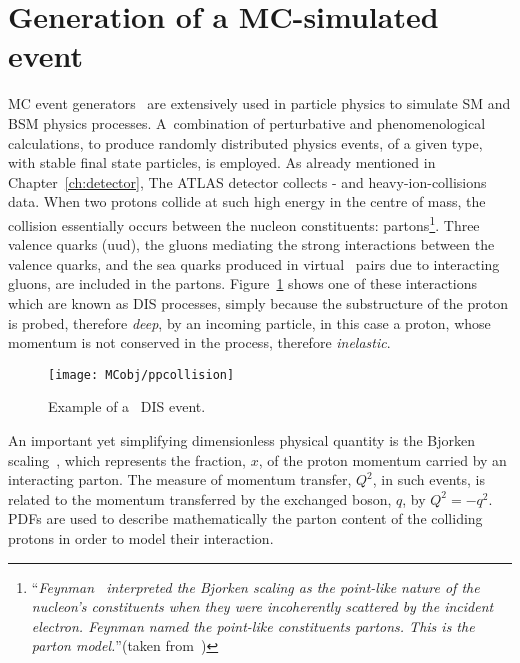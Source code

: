 	\section{Generation of a MC-simulated event}
	\label{sec:evGen}

		\ac{MC} event generators~\cite{Buckley:2011ms} are extensively used in particle physics to simulate \ac{SM} and \ac{BSM} physics processes. A combination of perturbative and phenomenological calculations, to produce randomly distributed physics events, of a given type, with stable final state particles, is employed. As already mentioned in Chapter~\ref{ch:detector}, The \ac{ATLAS} detector collects \pp- and heavy-ion-collisions data. When two protons collide at such high energy in the centre of mass, the collision essentially occurs between the nucleon constituents: partons\footnote{``\emph{Feynman~\cite{PhysRevLett.23.1415} interpreted the Bjorken scaling as the point-like nature of the nucleon's constituents when they were incoherently scattered by the incident electron. Feynman named the point-like constituents partons. This is the parton model.}''(taken from~\cite{Yan:2014kna})}. Three valence quarks (uud), the gluons mediating the strong interactions between the valence quarks, and the sea quarks produced in virtual \qqbar\ pairs due to interacting gluons, are included in the partons. Figure~\ref{fig:DIS} shows one of these interactions which are known as \ac{DIS} processes, simply because the substructure of the proton is probed, therefore \emph{deep}, by an incoming particle, in this case a proton, whose momentum is not conserved in the process, therefore \emph{inelastic}.

		\begin{figure}[!htb]
			\centering
			\texttt{[image: MCobj/ppcollision]}
			\caption{\label{fig:DIS} Example of a \pp\ \ac{DIS} event.}
		\end{figure}

		An important yet simplifying dimensionless physical quantity is the Bjorken scaling~\cite{PhysRev.179.1547}, which represents the fraction, $x$, of the proton momentum carried by an interacting parton. The measure of momentum transfer, $Q^2$, in such events, is related to the momentum transferred by the exchanged boson, $q$, by $Q^2 = -q^2$. \acp{PDF} are used to describe mathematically the parton content of the colliding protons in order to model their interaction.  

